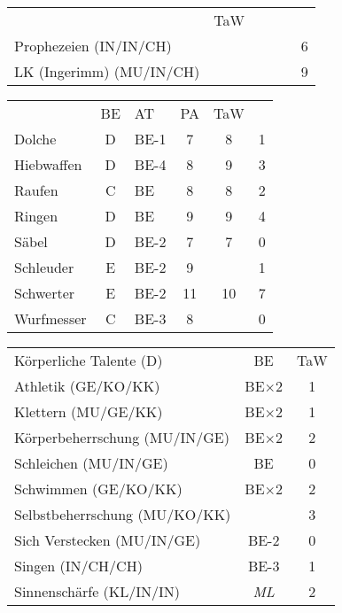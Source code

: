 \documentclass{article}
\begin{document}
  \begin{table}[ht]
    \centering
    \begin{tabularx}{0.8\linewidth}{|Xclcc|c|}
      \hline
      \rowcolor{gray}\multicolumn{5}{|l|}{Gabe (F)}&TaW\\
      \rowcolor{white} Prophezeien (IN/IN/CH) &&&&& 6\\
      \rowcolor{white} LK (Ingerimm) (MU/IN/CH) &&&&& 9\\
      \hline
    \end{tabularx}
    \centering
    \begin{tabularx}{0.8\linewidth}{|Xclcc|c|}
      \hline
      \rowcolor{gray} \multicolumn{2}{|l}{Kampftechniken}& BE & AT & PA &TaW\\ 
      \rowcolor{white}Dolche& D& BE-1& 7& 8& 1 \\
      \rowcolor{white}Hiebwaffen& D& BE-4& 8& 9& 3 \\
      \rowcolor{white}Raufen&C&BE&8&8&2\\ 
      \rowcolor{white}Ringen&D&BE&9&9&4\\ 
      \rowcolor{white}Säbel&D&BE-2&7&7&0\\ 
      \rowcolor{white}Schleuder&E&BE-2&9&&1\\ 
      \rowcolor{white}Schwerter&E&BE-2&11&10&7\\ 
      \rowcolor{white}Wurfmesser&C&BE-3&8&&0\\
      \hline
    \end{tabularx}
    \centering
    \begin{tabularx}{0.8\linewidth}{|Xc|c|}
      \hline
      \rowcolor{gray}  Körperliche Talente (D)& BE &TaW\\
      \rowcolor{white} Athletik (GE/KO/KK)& BE$\times$2 & 1\\
      \rowcolor{white} Klettern (MU/GE/KK)& BE$\times$2 & 1\\
      \rowcolor{white} Körperbeherrschung (MU/IN/GE) & BE$\times$2& 2\\
      \rowcolor{white} Schleichen (MU/IN/GE) & BE& 0\\
      \rowcolor{white} Schwimmen (GE/KO/KK) & BE$\times$2& 2\\
      \rowcolor{white} Selbstbeherrschung (MU/KO/KK)& & 3\\
      \rowcolor{white} Sich Verstecken (MU/IN/GE)&  BE-2&0\\
      \rowcolor{white} Singen (IN/CH/CH)& BE-3& 1\\
      \rowcolor{white} Sinnenschärfe (KL/IN/IN)& \emph{ML}&2\\

\end{tabularx}
\end{table}
\end{document}

